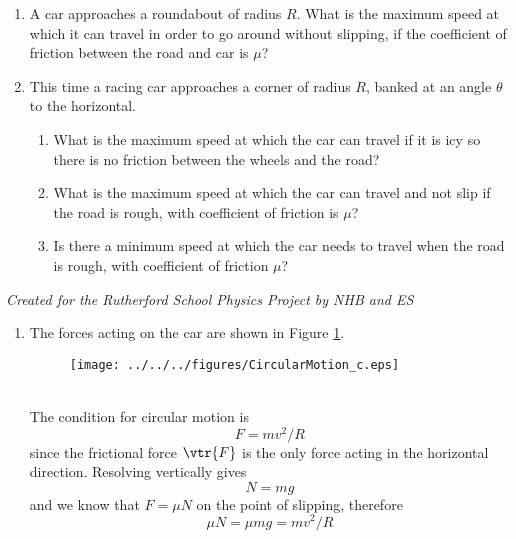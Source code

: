 

\begin{problem}
{
\begin{enumerate}
\item A car approaches a roundabout of radius $R$. What is the maximum speed at which it can travel in order to go around without slipping, if the coefficient of friction between the road and car is $\mu$?
\item This time a racing car approaches a corner of radius $R$, banked at an angle $\theta$ to the horizontal. 
\begin{enumerate}
\item What is the maximum speed at which the car can travel if it is icy so there is no friction between the wheels and the road?
\item What is the maximum speed at which the car can travel and not slip if the road is rough, with coefficient of friction is $\mu$?
\item Is there a minimum speed at which the car needs to travel when the road is rough, with coefficient of friction $\mu$?\end{enumerate} \end{enumerate}}
{\textit{Created for the Rutherford School Physics Project by NHB and ES}}
{\begin{enumerate}
\item The forces acting on the car are shown in Figure \ref{fig:CircularMotion_c}.
\begin{figure}[h]
\centering
\texttt{[image: ../../../figures/CircularMotion\_c.eps]}
\caption{}
\label{fig:CircularMotion_c}
\end{figure}
\\
The condition for circular motion is
\begin{equation*}
F=mv^2/R
\end{equation*}
since the frictional force $\vtr{F}$ is the only force acting in the horizontal direction. Resolving vertically gives
\begin{equation*}
N=mg
\end{equation*}
and we know that $F=\mu N$ on the point of slipping, therefore
\begin{equation*}
\mu N=\mu mg=mv^2/R
\end{equation*}

\end{enumerate}}
\end{problem}
